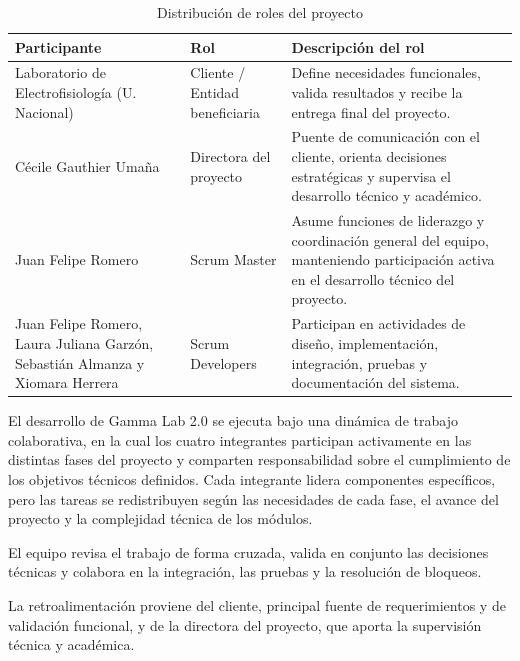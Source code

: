 \documentclass{article}
\begin{document}
\begin{table}[H]
\renewcommand{\arraystretch}{1.3}

\begin{tabular}{|p{3.5cm}|p{3.5cm}|p{4.5cm}|}
\hline
\textbf{Participante} & \textbf{Rol} & \textbf{Descripción del rol} \\ \hline

Laboratorio de Electrofisiología (U. Nacional) & Cliente / Entidad beneficiaria & Define necesidades funcionales, valida resultados y recibe la entrega final del proyecto. \\ \hline

Cécile Gauthier Umaña & Directora del proyecto & Puente de comunicación con el cliente, orienta decisiones estratégicas y supervisa el desarrollo técnico y académico. \\ \hline

Juan Felipe Romero & Scrum Master & Asume funciones de liderazgo y coordinación general del equipo, manteniendo participación activa en el desarrollo técnico del proyecto. \\ \hline

Juan Felipe Romero, Laura Juliana Garzón, Sebastián Almanza y Xiomara Herrera & Scrum Developers & Participan en actividades de diseño, implementación, integración, pruebas y documentación del sistema. \\ \hline

\end{tabular}
\centering
\caption{Distribución de roles del proyecto}
\label{tab:roles_equipo}
\end{table}

El desarrollo de Gamma Lab 2.0 se ejecuta bajo una dinámica de trabajo colaborativa, en la cual los cuatro integrantes participan activamente en las distintas fases del proyecto y comparten responsabilidad sobre el cumplimiento de los objetivos técnicos definidos. Cada integrante lidera componentes específicos, pero las tareas se redistribuyen según las necesidades de cada fase, el avance del proyecto y la complejidad técnica de los módulos.

El equipo revisa el trabajo de forma cruzada, valida en conjunto las decisiones técnicas y colabora en la integración, las pruebas y la resolución de bloqueos.

La retroalimentación proviene del cliente, principal fuente de requerimientos y de validación funcional, y de la directora del proyecto, que aporta la supervisión técnica y académica.
\end{document}
